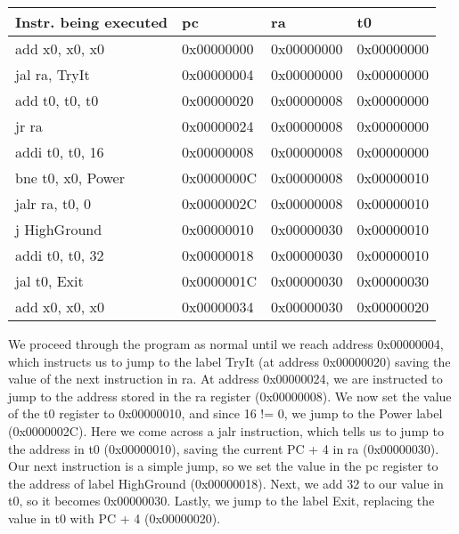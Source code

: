 \begin{blocksection}
\begin{solution}[0.5in]
\begin{center}
\begin{tabular}{ |l|l|l|l| } 
 \hline
 Instr. being executed & pc & ra & t0  \\ 
 \hline
 add x0, x0, x0 & 0x00000000 & 0x00000000 & 0x00000000   \\
 \hline
 jal ra, TryIt  & 0x00000004 & 0x00000000 & 0x00000000 \\
 \hline 
 add t0, t0, t0 & 0x00000020 & 0x00000008 & 0x00000000  \\
 \hline
 jr ra & 0x00000024 & 0x00000008 & 0x00000000\\
 \hline 
 addi t0, t0, 16 & 0x00000008 & 0x00000008 & 0x00000000 \\
 \hline
 bne t0, x0, Power & 0x0000000C & 0x00000008 & 0x00000010  \\
 \hline
 jalr ra, t0, 0 & 0x0000002C & 0x00000008 & 0x00000010 \\
 \hline
 j HighGround & 0x00000010 & 0x00000030 & 0x00000010 \\
 \hline
 addi t0, t0, 32 & 0x00000018 & 0x00000030 & 0x00000010 \\
 \hline
 jal t0, Exit & 0x0000001C & 0x00000030 & 0x00000030 \\
 \hline
 add x0, x0, x0 & 0x00000034 & 0x00000030 & 0x00000020 \\
 \hline
\end{tabular}
\end{center}

We proceed through the program as normal until we reach address 0x00000004, which instructs us to jump to the label TryIt (at address 0x00000020) saving the value of the next instruction in ra. 
At address 0x00000024, we are instructed to jump to the address stored in the ra register (0x00000008). We now set the value of the t0 register to 0x00000010, and since 16 != 0, we jump to the Power label (0x0000002C). 
Here we come across a jalr instruction, which tells us to jump to the address in t0 (0x00000010), saving the current PC + 4 in ra (0x00000030). 
Our next instruction is a simple jump, so we set the value in the pc register to the address of label HighGround (0x00000018). Next, we add 32 to our value in t0, so it becomes 0x00000030. 
Lastly, we jump to the label Exit, replacing the value in t0 with PC + 4 (0x00000020).
\end{solution}

\end{blocksection}
